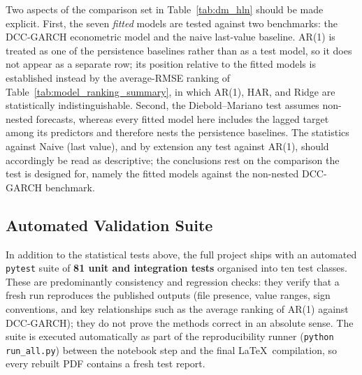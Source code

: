 Two aspects of the comparison set in Table~\ref{tab:dm_hln} should be made explicit.
First, the seven \emph{fitted} models are tested against two benchmarks: the DCC-GARCH
econometric model and the naive last-value baseline. AR(1) is treated as one of the
persistence baselines rather than as a test model, so it does not appear as a separate
row; its position relative to the fitted models is established instead by the
average-RMSE ranking of Table~\ref{tab:model_ranking_summary}, in which AR(1), HAR, and
Ridge are statistically indistinguishable. Second, the Diebold--Mariano test assumes
non-nested forecasts, whereas every fitted model here includes the lagged target among
its predictors and therefore nests the persistence baselines. The statistics against
Naive (last value), and by extension any test against AR(1), should accordingly be read as
descriptive; the conclusions rest on the comparison the test is designed for, namely the
fitted models against the non-nested DCC-GARCH benchmark.

\subsection{Automated Validation Suite}
\label{subsec:auto_tests}

In addition to the statistical tests above, the full project ships with an
automated \texttt{pytest} suite of \textbf{81 unit and integration tests}
organised into ten test classes. These are predominantly consistency and regression
checks: they verify that a fresh run reproduces the published outputs (file presence,
value ranges, sign conventions, and key relationships such as the average ranking of
AR(1) against DCC-GARCH); they do not prove the methods correct in an absolute sense.
The suite is executed automatically as part of the reproducibility runner
(\texttt{python run\_all.py}) between the notebook step and the final
\LaTeX\ compilation, so every rebuilt PDF contains a fresh test report.


